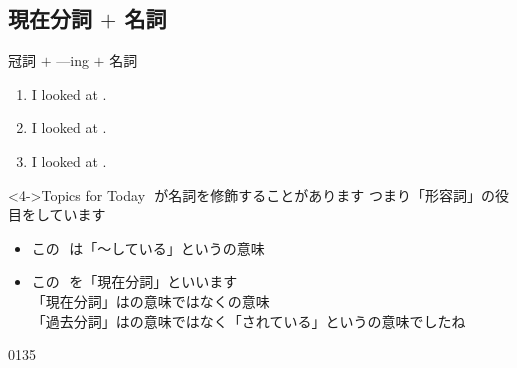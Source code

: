 \documentclass[aspectratio=169,xcolor={dvipsnames,table}]{beamer}
\begin{document}
\subsection{現在分詞 $+$ 名詞}
\begin{frame}[plain,t]{冠詞 $+$ ---ing $+$ 名詞}
 \begin{enumerate}
	 \item<1-> I looked at .\hspace{35pt}{\scriptsize look at ～を見る}\hfill{\scriptsize {}}
	 \item<2-> I looked at .\hfill{\scriptsize {}}
	 \item<3-> I looked at .\hfill{\scriptsize {}}
 \end{enumerate}

\vspace{20pt}

\begin{block}<4->{Topics for Today}\small
{}\,\,が名詞を修飾することがあります%
\hfill{\scriptsize つまり「形容詞」の役目をしています}

\begin{itemize}[square]\small
 \item<5-> この\,\,\,\,は「～している」というの意味
 \item<6-> この\,\,\,\,を「現在分詞」といいます\\
{\scriptsize \textdbend\textdbend 「現在分詞」はの意味ではなくの意味}\\
\hfill{\scriptsize 「過去分詞」はの意味ではなく「されている」というの意味でしたね}
 \end{itemize}
     \end{block}
\vspace*{-5pt}

\mbox{}\hfill\tiny 0135{\,}{\scriptsize {}}
\end{frame}
\end{document}
